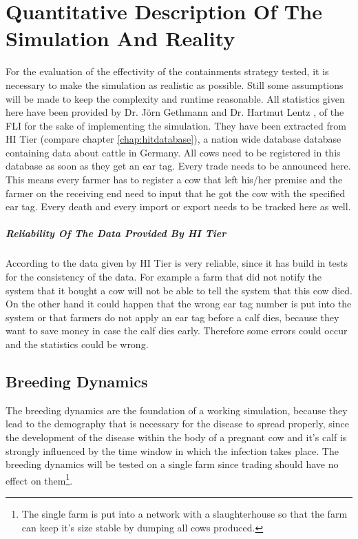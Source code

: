 \chapter{Quantitative Description Of The Simulation And Reality}
For the evaluation of the effectivity of the containments strategy tested, it is necessary to make the simulation as realistic as possible. Still some assumptions will be made to keep the complexity and runtime reasonable. 
All statistics given here have been provided by Dr. Jörn Gethmann and Dr. Hartmut Lentz \citep{personalCom},\citep{personalCom1} of the FLI for the sake of implementing the simulation. They have been extracted from HI Tier (compare chapter \ref{chap:hitdatabase}), a nation wide database database containing data about cattle in Germany. All cows need to be registered in this database as soon as they get an ear tag. Every trade needs to be announced here. This means every farmer has to register a cow that left his/her premise and the farmer on the receiving end need to input that he got the cow with the specified ear tag. Every death and every import or export needs to be tracked here as well.
\paragraph{Reliability Of The Data Provided By HI Tier}
According to \citep{personalCom} the data given by HI Tier is very reliable, since it has build in tests for the consistency of the data. For example a farm that did not notify the system that it bought a cow will not be able to tell the system that this cow died. On the other hand it could happen that the wrong ear tag number is put into the system or that farmers do not apply an ear tag before a calf dies, because they want to save money in case the calf dies early. Therefore some errors could occur and the statistics could be wrong.
\section{Breeding Dynamics}\label{chap:breedingDynamics}
The breeding dynamics are the foundation of a working simulation, because they lead to the demography that is necessary for the disease to spread properly, since the development of the disease within the body of a pregnant cow and it's calf is strongly influenced by the time window in which the infection takes place.
The breeding dynamics will be tested on a single farm since trading should have no effect on them\footnote{The single farm is put into a network with a slaughterhouse so that the farm can keep it's size stable by dumping all cows produced.}.
